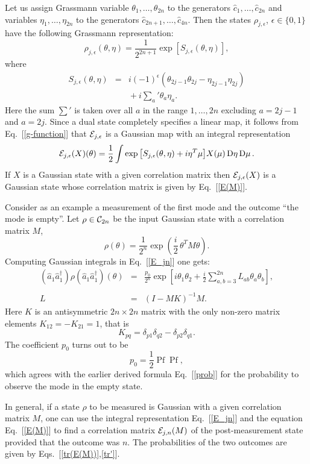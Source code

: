 \documentclass[twocolumn,showpacs,preprintnumbers,superscriptaddress]{revtex4}
\newcommand{\calE}{{\cal E }}
\newcommand{\Clif}{{\cal C}}
\newcommand{\D}[1]{\mathop{\mathrm{D}#1}}
\newcommand{\be}{\begin{equation}}
\newcommand{\ee}{\end{equation}}
\newcommand{\nn}{\nonumber}
\newcommand{\Pf}[1]{\mathop{\mathrm{Pf}(#1)}}
\newcommand{\aop}{{\hat{a}}}
\newcommand{\cop}{{\hat{c}}}
\begin{document}
Let us assign Grassmann variable $\theta_1,\ldots,\theta_{2n}$ to
the generators $\cop_1,\ldots,\cop_{2n}$ and variables $\eta_1,\ldots,\eta_{2n}$
to the generators $\cop_{2n+1},\ldots,\cop_{4n}$.
Then the states $\rho_{j,\epsilon}$, $\epsilon \in \{0,1\}$ 
have the following Grassmann representation:
\[
\rho_{j,\epsilon}(\theta,\eta)=\frac1{2^{2n+1}} 
\exp{\left[ S_{j,\epsilon}(\theta,\eta)\right]},
\]
where 
\begin{eqnarray}
S_{j,\epsilon}(\theta,\eta) &=&
i(-1)^{\epsilon} (\theta_{2j-1}\theta_{2j} -  \eta_{2j-1}\eta_{2j}) \nn \\ 
&& {} +i{\sum_{a}}' \theta_a \eta_{a}.\nn
\end{eqnarray}
Here the sum $\sum'$ is taken over all $a$ in the range $1,\ldots,2n$
excluding $a=2j-1$ and $a=2j$. Since a dual state completely specifies a linear
map, it follows from Eq.~[\ref{g-function}] 
that $\calE_{j,\epsilon}$ is a Gaussian map with an integral representation
\be\label{E_jn}
\calE_{j,\epsilon}(X)(\theta)
= \frac12 \int \exp{\left[ S_{j,\epsilon}(\theta,\eta) + i\eta^T \mu \right]}
X(\mu) \D{\eta}\D{\mu}.
\ee
If $X$ is a Gaussian state with a given correlation matrix then $\calE_{j,\epsilon}(X)$
is a Gaussian state whose correlation matrix is given by Eq.~[\ref{E(M)}]. 

Consider as an example a measurement of the first mode and the
outcome ``the mode is empty''. Let $\rho\in \Clif_{2n}$ be the input
Gaussian state  with a correlation matrix $M$,
\[
\rho(\theta) = \frac1{2^n} \exp{\left( \frac{i}2\,
\theta^T M \theta \right)}.
\]
Computing Gaussian integrals in Eq.~[\ref{E_jn}] one gets:
\begin{eqnarray}
(\aop_1\aop_1^\dag)\rho(\aop_1 \aop_1^\dag)(\theta)  &=&
\frac{p_0}{2^n} 
\exp{
\left[ i\theta_1\theta_2 +
\frac{i}2 \sum_{a,b=3}^{2n} L_{ab}\theta_a \theta_b
\right]},  \nn \\
&& \nn \\
L &=& (I - M K)^{-1} M. \nn
\end{eqnarray}
Here $K$ is an antisymmetric $2n\times 2n$ matrix with the only non-zero
matrix elements $K_{12}=-K_{21}=1$, that is
\[
K_{pq}=\delta_{p1}\delta_{q2}-\delta_{p2}\delta_{q1}.
\]
The coefficient $p_0$ turns out to be
\[
p_0=\frac1{2} \Pf{M} \Pf{K - M^{-1}},
\]
which agrees with the earlier derived formula Eq.~[\ref{prob}]
for the probability to observe the mode in the empty state.

In general, if a state $\rho$ to be measured is Gaussian with a given correlation
matrix $M$,
one can use the integral representation Eq.~[\ref{E_jn}]
and the equation Eq.~[\ref{E(M)}] to find a correlation matrix 
$\calE_{j,n}(M)$ of the post-measurement state 
provided that the outcome was $n$. The  probabilities of 
the two outcomes  are given by Eqs.~[\ref{tr(E(M))},\ref{tr'}].
\end{document}
